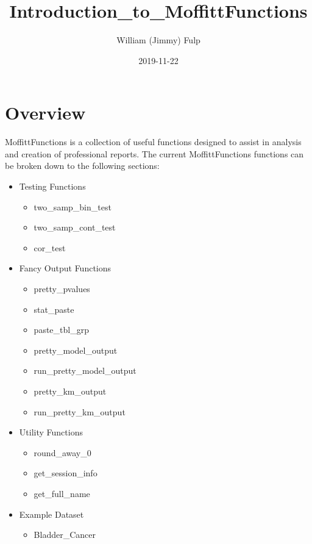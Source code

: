 \documentclass[table]{article}
\title{Introduction\_to\_MoffittFunctions}
\author{William (Jimmy) Fulp}
\date{2019-11-22}
\providecommand{\tightlist}{%
  \setlength{\itemsep}{0pt}\setlength{\parskip}{0pt}}
\begin{document}
\maketitle

{
\setcounter{tocdepth}{2}
\tableofcontents
}
\listoftables

\clearpage

\hypertarget{overview}{%
\section{Overview}\label{overview}}

MoffittFunctions is a collection of useful functions designed to assist
in analysis and creation of professional reports. The current
MoffittFunctions functions can be broken down to the following sections:

\begin{itemize}
\tightlist
\item
  Testing Functions

  \begin{itemize}
  \tightlist
  \item
    two\_samp\_bin\_test
  \item
    two\_samp\_cont\_test
  \item
    cor\_test
  \end{itemize}
\item
  Fancy Output Functions

  \begin{itemize}
  \tightlist
  \item
    pretty\_pvalues
  \item
    stat\_paste
  \item
    paste\_tbl\_grp
  \item
    pretty\_model\_output
  \item
    run\_pretty\_model\_output
  \item
    pretty\_km\_output
  \item
    run\_pretty\_km\_output
  \end{itemize}
\item
  Utility Functions

  \begin{itemize}
  \tightlist
  \item
    round\_away\_0
  \item
    get\_session\_info
  \item
    get\_full\_name
  \end{itemize}
\item
  Example Dataset

  \begin{itemize}
  \tightlist
  \item
    Bladder\_Cancer
  \end{itemize}
\end{itemize}
\end{document}
